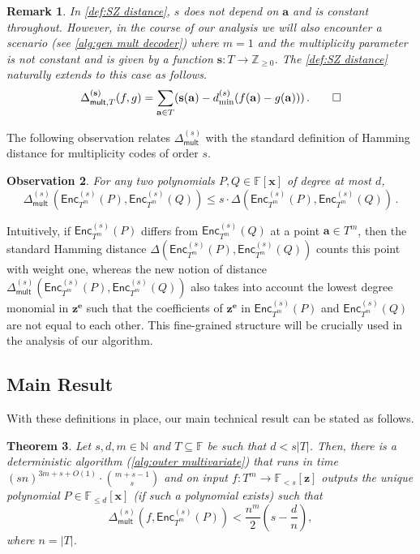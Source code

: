 \documentclass{article}
\newtheorem{theorem}{Theorem}\newtheorem{lemma}[theorem]{Lemma}\newtheorem{proposition}[theorem]{Proposition}\newtheorem{corollary}[theorem]{Corollary}\newtheorem{definition}[theorem]{Definition}\newtheorem{claim}[theorem]{Claim}\newtheorem{remark}[theorem]{Remark}\newtheorem{observation}[theorem]{Observation}
\def\Integer{\mathbb{Z}}
\def\Natural{\mathbb{N}}
\def\Field{\mathbb{F}}
\let\N\Natural
\let\Z\Integer
\let\F\Field
\def\abs#1{\left| #1 \right|}
\def\veca{\mathbf{a}}
\def\vece{\mathbf{e}}
\def\vecx{\mathbf{x}}
\def\vecz{\mathbf{z}}
\newcommand{\encst}{{\mathsf{Enc}_{T^m}^{(s)}}}
\newcommand{\Del}{\Delta}
\newcommand{\Delm}{\Delta_{\mathsf{mult}}}
\newcommand{\vz}{\vecz}
\newcommand{\vx}{\vecx}
\newcommand{\ve}{\vece}
\newcommand{\va}{\veca}
\newcommand{\sbar}{\mathbf{s}}
\begin{document}
	\begin{remark}\label{rmk:Delm for non-constant s}
		In \cref{def:SZ distance}, $s$ does not depend on $\va$ and is
		constant throughout. However, in the course of our analysis we will
		also encounter a scenario (see \cref{alg:gen mult decoder}) where $m =
		1$ and the multiplicity parameter is not constant and is given by a
		function $\sbar\colon T \to \Z_{\geq 0}$. The \cref{def:SZ distance} naturally extends to this case as follows.
		\[ \Delta_{\mathsf{mult}, T}^{(\sbar)} (f, g) = \sum_{\va \in T} (\sbar(\va) - d^{(s)}_{\min}(f(\va) - g(\va)))\,.\qedhere\]
	\end{remark}
	
	
	The following observation relates $\Delm^{(s)}$ with the standard definition of Hamming distance for multiplicity codes of order $s$. 
	\begin{observation}\label{obs:delm vs del}
		For any two polynomials $P, Q \in \F[\vx]$ of degree at most $d$, 
		\[
		\Delm^{(s)}(\encst(P), \encst(Q)) \leq s\cdot \Del(\encst(P), \encst(Q)) \, .
		\]
	\end{observation}
	Intuitively, if $\encst(P)$ differs from $\encst(Q)$ at a point 
	$\va \in T^m$, then the standard Hamming distance $\Del(\encst(P), \encst(Q))$ counts this point with weight one, whereas the new notion of distance $\Delm^{(s)}(\encst(P), \encst(Q))$ also takes into account 
	the lowest degree monomial in $\vz^{\ve}$ such that the coefficients of $\vz^{\ve}$ in $\encst(P)$ and $\encst(Q)$ are not equal to each other. This fine-grained structure will be crucially used in the analysis of our algorithm. 
	
	\subsection{Main Result}
	
	With these definitions in place, our main technical result can be stated as follows. 
	\begin{theorem}\label{thm:main tech result}
		Let $s, d, m \in \N$ and $T \subseteq \F$ be such that $d <
		s|T|$. Then, there is a deterministic algorithm (\cref{alg:outer multivariate})
		that runs in time $(sn)^{3m + s + O(1)}\cdot \binom{m+s-1}{s}$ and on input
		$f\colon T^m \to \mathbb{F}_{<s}[\vz]$ outputs the unique polynomial
		$P \in \mathbb{F}_{\leq d}[\vx]$ (if such a polynomial exists) such
		that
		\[\Delm^{(s)}(f, \encst(P)) < \frac{n^m}{2}\left(s-\frac{d}{n}\right),\]
		where $n = \abs{T}$.
	\end{theorem}
	
\end{document}
